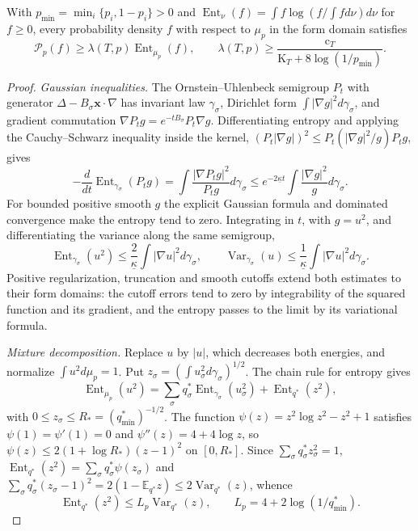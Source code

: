 \begin{lemma}\label{lem:sel_lsi}
With $p_{\min}=\min_i\{p_i,1-p_i\}>0$ and $\operatorname{Ent}_\nu(f)=\int f\log(f/\int fd\nu)d\nu$ for $f\ge0$, every probability density $f$ with respect to $\mu_p$ in the form domain satisfies
\begin{equation}
\mathcal P_p(f)\ge\lambda(T,p)\operatorname{Ent}_{\mu_p}(f),\qquad
\lambda(T,p)\ge\frac{\mathrm c_T}{\mathrm K_T+8\log(1/p_{\min})}.
\label{eq:sel_entropy_contraction}
\end{equation}
\end{lemma}

\begin{proof}
\emph{Gaussian inequalities.} The Ornstein--Uhlenbeck semigroup $P_t$ with generator $\Delta-B_\sigma\mathbf x\cdot\nabla$ has invariant law $\gamma_\sigma$, Dirichlet form $\int|\nabla g|^2d\gamma_\sigma$, and gradient commutation $\nabla P_tg=e^{-tB_\sigma}P_t\nabla g$. Differentiating entropy and applying the Cauchy--Schwarz inequality inside the kernel, $(P_t|\nabla g|)^2\le P_t(|\nabla g|^2/g)P_tg$, gives
\[
-\frac d{dt}\operatorname{Ent}_{\gamma_\sigma}(P_tg)=\int\frac{|\nabla P_tg|^2}{P_tg}d\gamma_\sigma\le e^{-2\underline\kappa t}\int\frac{|\nabla g|^2}gd\gamma_\sigma.
\]
For bounded positive smooth $g$ the explicit Gaussian formula and dominated convergence make the entropy tend to zero. Integrating in $t$, with $g=u^2$, and differentiating the variance along the same semigroup,
\begin{equation}
\operatorname{Ent}_{\gamma_\sigma}(u^2)\le\frac2{\underline\kappa}\int|\nabla u|^2d\gamma_\sigma,\qquad
\operatorname{Var}_{\gamma_\sigma}(u)\le\frac1{\underline\kappa}\int|\nabla u|^2d\gamma_\sigma.
\label{eq:sel_gaussian_inequalities}
\end{equation}
Positive regularization, truncation and smooth cutoffs extend both estimates to their form domains: the cutoff errors tend to zero by integrability of the squared function and its gradient, and the entropy passes to the limit by its variational formula.

\emph{Mixture decomposition.} Replace $u$ by $|u|$, which decreases both energies, and normalize $\int u^2d\mu_p=1$. Put $z_\sigma=(\int u_\sigma^2d\gamma_\sigma)^{1/2}$. The chain rule for entropy gives
\[
\operatorname{Ent}_{\mu_p}(u^2)=\sum_\sigma q^*_\sigma\operatorname{Ent}_{\gamma_\sigma}(u_\sigma^2)+\operatorname{Ent}_{q^*}(z^2),
\]
with $0\le z_\sigma\le R_*=(q^*_{\min})^{-1/2}$. The function $\psi(z)=z^2\log z^2-z^2+1$ satisfies $\psi(1)=\psi'(1)=0$ and $\psi''(z)=4+4\log z$, so $\psi(z)\le2(1+\log R_*)(z-1)^2$ on $[0,R_*]$. Since $\sum_\sigma q^*_\sigma z_\sigma^2=1$, $\operatorname{Ent}_{q^*}(z^2)=\sum_\sigma q^*_\sigma\psi(z_\sigma)$ and $\sum_\sigma q^*_\sigma(z_\sigma-1)^2=2(1-\mathbb E_{q^*}z)\le2\operatorname{Var}_{q^*}(z)$, whence
\[
\operatorname{Ent}_{q^*}(z^2)\le L_p\operatorname{Var}_{q^*}(z),\qquad L_p=4+2\log(1/q^*_{\min}).
\]


\end{proof}
